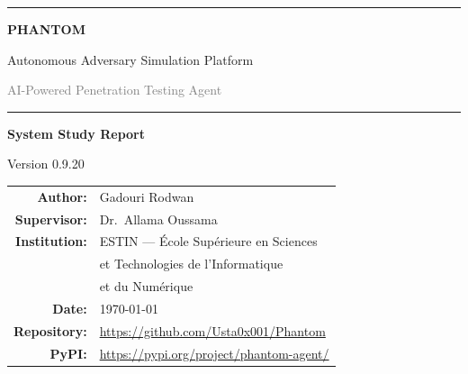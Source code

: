 \documentclass[12pt,a4paper]{report}
\begin{document}
\begin{titlepage}
\centering
\vspace*{2cm}

\noindent\textcolor{phantom}{\rule{\textwidth}{2pt}}
\vspace{0.8cm}

{\fontsize{48}{52}\selectfont\bfseries\textcolor{phantom}{PHANTOM}\par}
\vspace{0.5cm}
{\LARGE\textcolor{dark}{Autonomous Adversary Simulation Platform}\par}
\vspace{0.3cm}
{\large\textcolor{gray}{AI-Powered Penetration Testing Agent}\par}

\vspace{0.8cm}
\noindent\textcolor{phantom}{\rule{\textwidth}{2pt}}

\vspace{1.5cm}

{\Large\bfseries System Study Report\par}
\vspace{0.3cm}
{\large Version 0.9.20\par}

\vspace{2.5cm}

\begin{tabular}{rl}
\textcolor{phantom}{\bfseries Author:}     & \large Gadouri Rodwan \\[8pt]
\textcolor{phantom}{\bfseries Supervisor:}  & \large Dr.\ Allama Oussama \\[8pt]
\textcolor{phantom}{\bfseries Institution:} & \large ESTIN --- \'Ecole Sup\'erieure en Sciences \\
                                            & \large et Technologies de l'Informatique \\
                                            & \large et du Num\'erique \\[8pt]
\textcolor{phantom}{\bfseries Date:}        & \large \today \\[8pt]
\textcolor{phantom}{\bfseries Repository:}  & \large \url{https://github.com/Usta0x001/Phantom} \\[8pt]
\textcolor{phantom}{\bfseries PyPI:}        & \large \url{https://pypi.org/project/phantom-agent/} \\
\end{tabular}

\vfill
\end{titlepage}
\end{document}
